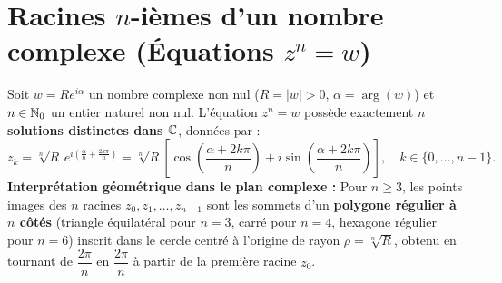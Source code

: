 \section{Racines $n$-ièmes d'un nombre complexe (Équations $z^n = w$)}

\begin{theoreme}
Soit $w = R e^{i\alpha}$ un nombre complexe non nul ($R = |w| > 0$, $\alpha = \arg(w)$) et $n \in \mathbb{N}_0$ un entier naturel non nul. L'équation $\boxed{z^n = w}$ possède exactement \textbf{$n$ solutions distinctes dans $\mathbb{C}$}, données par :
\[
    \boxed{z_k = \sqrt[n]{R} \, e^{i\left(\frac{\alpha}{n} + \frac{2k\pi}{n}\right)} = \sqrt[n]{R}\left[\cos\left(\frac{\alpha + 2k\pi}{n}\right) + i\sin\left(\frac{\alpha + 2k\pi}{n}\right)\right], \quad k \in \{0, \dots, n-1\}}.
\]
\textbf{Interprétation géométrique dans le plan complexe :} Pour $n \ge 3$, les points images des $n$ racines $z_0, z_1, \dots, z_{n-1}$ sont les sommets d'un \textbf{polygone régulier à $n$ côtés} (triangle équilatéral pour $n=3$, carré pour $n=4$, hexagone régulier pour $n=6$) inscrit dans le cercle centré à l'origine de rayon $\rho = \sqrt[n]{R}$, obtenu en tournant de $\dfrac{2\pi}{n}$ en $\dfrac{2\pi}{n}$ à partir de la première racine $z_0$.
\end{theoreme}

